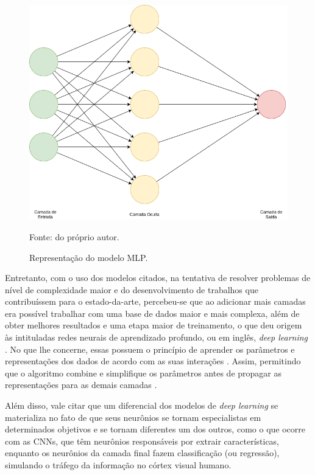 \begin{figure}[H]
    \centering
    \caption{Representação do modelo MLP.}
    \includegraphics[width=1\linewidth]{recursos/imagens/deep/mlp.png}
    \label{deep:fig:4}

    Fonte: do próprio autor.
\end{figure}

Entretanto, com o uso dos modelos citados, na tentativa de resolver problemas de nível de complexidade maior e do desenvolvimento de trabalhos que contribuíssem para o estado-da-arte, percebeu-se que ao adicionar mais camadas era possível trabalhar com uma base de dados maior e mais complexa, além de obter melhores resultados e uma etapa maior de treinamento, o que deu origem às intituladas redes neurais de aprendizado profundo, ou em inglês, \textit{deep learning} \citep{Goodfellow2016}. No que lhe concerne, essas possuem o princípio de aprender os parâmetros e representações dos dados de acordo com as suas interações \citep{ponti2018funciona}. 
Assim, permitindo que o algoritmo combine e simplifique os parâmetros antes de propagar as representações para as demais camadas \citep{Goodfellow2016}.

Além disso, vale citar que um diferencial dos modelos de \textit{deep learning} se materializa no fato de que seus neurônios se tornam especialistas em determinados objetivos e se tornam diferentes um dos outros, como o que ocorre com as CNNs, que têm neurônios responsáveis por extrair características, enquanto os neurônios da camada final fazem classificação (ou regressão), simulando o tráfego da informação no córtex visual humano.

